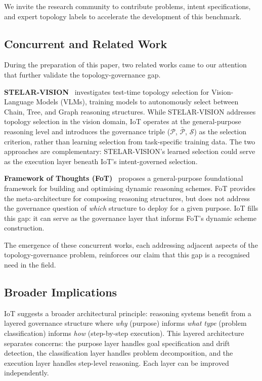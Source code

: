 \documentclass[11pt,a4paper]{article}
\begin{document}
We invite the research community to contribute problems, intent specifications, and expert topology labels to accelerate the development of this benchmark.

\subsection{Concurrent and Related Work}

During the preparation of this paper, two related works came to our attention that further validate the topology-governance gap.

\textbf{STELAR-VISION}~\citep{stelar2025vision} investigates test-time topology selection for Vision-Language Models (VLMs), training models to autonomously select between Chain, Tree, and Graph reasoning structures. While STELAR-VISION addresses topology selection in the vision domain, IoT operates at the general-purpose reasoning level and introduces the governance triple ($\mathcal{P}$, $\bar{\mathcal{P}}$, $\mathcal{S}$) as the selection criterion, rather than learning selection from task-specific training data. The two approaches are complementary: STELAR-VISION's learned selection could serve as the execution layer beneath IoT's intent-governed selection.

\textbf{Framework of Thoughts (FoT)}~\citep{ding2024fot} proposes a general-purpose foundational framework for building and optimising dynamic reasoning schemes. FoT provides the meta-architecture for composing reasoning structures, but does not address the governance question of \emph{which} structure to deploy for a given purpose. IoT fills this gap: it can serve as the governance layer that informs FoT's dynamic scheme construction.

The emergence of these concurrent works, each addressing adjacent aspects of the topology-governance problem, reinforces our claim that this gap is a recognised need in the field.

\subsection{Broader Implications}

IoT suggests a broader architectural principle: reasoning systems benefit from a layered governance structure where \emph{why} (purpose) informs \emph{what type} (problem classification) informs \emph{how} (step-by-step execution). This layered architecture separates concerns: the purpose layer handles goal specification and drift detection, the classification layer handles problem decomposition, and the execution layer handles step-level reasoning. Each layer can be improved independently.
\end{document}
